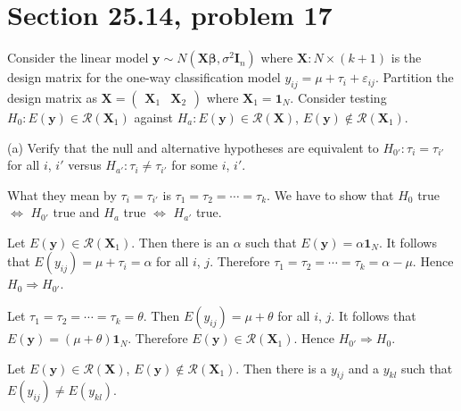 
\section{Section 25.14, problem 17}
Consider the linear model $\mathbf y\sim N(\mathbf X\bm\beta,
\sigma^2\mathbf I_n)$ where $\mathbf X: N\times(k+1)$ is the
design matrix for the one-way classification model
$y_{ij}=\mu+\tau_i+\varepsilon_{ij}$.
Partition the design matrix as $\mathbf X=
\begin{pmatrix}\mathbf X_1 & \mathbf X_2\end{pmatrix}$
where $\mathbf X_1=\mathbf 1_N$.
Consider testing $H_0:E(\mathbf y)\in\mathcal R(\mathbf X_1)$
against $H_a:E(\mathbf y)\in\mathcal R(\mathbf X)$,
$E(\mathbf y)\not\in\mathcal R(\mathbf X_1)$.

\bigskip
\noindent
(a) Verify that the null and alternative hypotheses are equivalent
to $H_{0'}:\tau_i=\tau_{i'}$ for all $i$, $i'$ versus
$H_{a'}:\tau_i\ne\tau_{i'}$ for some $i$, $i'$.

\bigskip
\noindent
What they mean by $\tau_i=\tau_{i'}$ is
$\tau_1=\tau_2=\cdots=\tau_k$.
We have to show that $H_0$ true $\Leftrightarrow$
$H_{0'}$ true and $H_a$ true $\Leftrightarrow$ $H_{a'}$ true.

\bigskip
\noindent
Let $E(\mathbf y)\in\mathcal R(\mathbf X_1)$.
Then there is an $\alpha$ such that $E(\mathbf y)=\alpha\mathbf1_N$.
It follows that $E(y_{ij})=\mu+\tau_i=\alpha$ for all $i$, $j$.
Therefore $\tau_1=\tau_2=\cdots=\tau_k=\alpha-\mu$.
Hence $H_0\Rightarrow H_{0'}$.

\bigskip
\noindent
Let $\tau_1=\tau_2=\cdots=\tau_k=\theta$.
Then $E(y_{ij})=\mu+\theta$ for all $i$, $j$.
It follows that $E(\mathbf y)=(\mu+\theta)\mathbf 1_N$.
Therefore $E(\mathbf y)\in\mathcal R(\mathbf X_1)$.
Hence $H_{0'}\Rightarrow H_0$.

\bigskip
\noindent
Let $E(\mathbf y)\in\mathcal R(\mathbf X)$,
$E(\mathbf y)\not\in\mathcal R(\mathbf X_1)$.
Then there is a $y_{ij}$ and a $y_{kl}$ such that
$E(y_{ij})\ne E(y_{kl})$.

